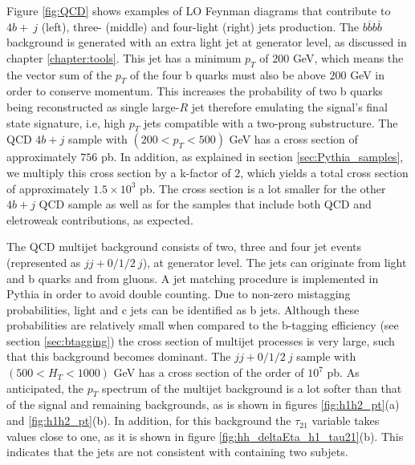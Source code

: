 Figure \ref{fig:QCD} shows examples of LO Feynman diagrams that contribute to $4b+~j$ (left), three- (middle) and four-light (right) jets production. The $b\overline{b}b\overline{b}$ background is generated with an extra light jet at generator level, as discussed in chapter \ref{chapter:tools}. This jet has a minimum $p_T$ of $200$ GeV, which means the the vector sum of the $p_T$ of the four b quarks must also be above $200$ GeV in order to conserve momentum. This increases the probability of two b quarks being reconstructed as single large-$R$ jet therefore emulating the signal's final state signature, i.e, high $p_T$ jets compatible with a two-prong substructure. The QCD $4b+j$ sample with $(200<p_T<500)$ GeV has a cross section of approximately $756$ pb. In addition, as explained in section \ref{sec:Pythia_samples}, we multiply this cross section by a k-factor of $2$, which yields a total cross section of approximately $1.5\times 10^{3}$ pb. The cross section is a lot smaller for the other $4b+j$ QCD sample as well as for the samples that include both QCD and eletroweak contributions, as expected.

The QCD multijet background consists of two, three and four jet events (represented as $jj+0/1/2 ~j$), at generator level. The jets can originate from light and b quarks and from gluons. A jet matching procedure is implemented in Pythia in order to avoid double counting. Due to non-zero mistagging probabilities, light and c jets can be identified as b jets. Although these probabilities are relatively small when compared to the b-tagging efficiency (see section \ref{sec:btagging}) the cross section of multijet processes is very large, such that this background becomes dominant. The $jj+0/1/2 ~j$ sample with $(500<H_T<1000)$ GeV has a cross section of the order of $10^7$ pb. As anticipated, the $p_T$ spectrum of the multijet background is a lot softer than that of the signal and remaining backgrounds, as is shown in figures \ref{fig:h1h2_pt}(a) and \ref{fig:h1h2_pt}(b). In addition, for this background the $\tau_{21}$ variable takes values close to one, as it is shown in figure \ref{fig:hh_deltaEta_h1_tau21}(b). This indicates that the jets are not consistent with containing two subjets. 

